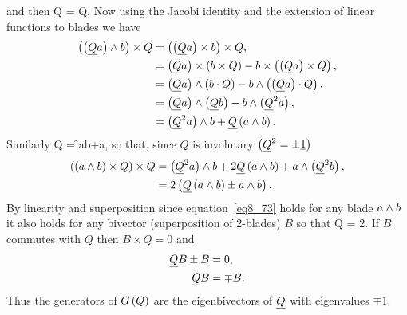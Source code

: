 and then
\be
	\times Q = \times Q.	                                           
\ee
Now using the Jacobi identity and the extension of linear functions to blades we have
\begin{align}
	 \left ( {\left ( {\underline{Q}a} \right )\wedge b} \right )\times Q &= \left ( {\left ( {\underline{Q}a} \right )\times b} \right )\times Q, \nonumber \\
	                                       &= \left ( {\underline{Q}a} \right )\times\left ( {b\times Q} \right )
	                                          -b\times\left ( {\left ( {\underline{Q}a} \right )\times Q} \right ), \nonumber \\
	                                       &= \left ( {\underline{Q}a} \right )\wedge\left ( {b\cdot Q} \right )
	                                          -b\wedge\left ( {\left ( {\underline{Q}a} \right )\cdot Q} \right ), \nonumber \\
	                                       &= \left ( {\underline{Q}a} \right )\wedge\left ( {\underline{Q}b} \right )
	                                          -b\wedge\left ( {\underline{Q}^{2}a} \right ), \nonumber \\
	                                       &= \left ( {\underline{Q}^{2}a} \right )\wedge b+{\underline{Q}}\left ( {a\wedge b} \right ).
\end{align}
Similarly
\be
	\times Q = \f{}{a\W b}+a\W{},
\ee
so that, since $Q$ is involutary $\left ( {\underline{Q}^{2}=\pm\underline{1}} \right )$
\begin{align}
	\left ( {\left ( {a\wedge b} \right )\times Q} \right )\times Q &= \left ( {\underline{Q}^{2}a} \right )\wedge b+2\underline{Q}\left ( {a\wedge b} \right )
	                                         +a\wedge\left ( {\underline{Q}^{2}b} \right ), \nonumber \\
	                                      &= 2\left ( {{\underline{Q}}\left ( {a\wedge b} \right )\pm a\wedge b} \right ).\label{eq8_73}
\end{align}
By linearity and superposition since equation~\ref{eq8_73} holds for any blade $a\wedge b$ it also holds
for any bivector (superposition of 2-blades) $B$ so that
\be
	\times Q = 2.
\ee
If $B$ commutes with $Q$ then $B\times Q = 0$ and
\begin{align}
	\underline{Q}B\pm B &= 0, \\
	\underline{Q}B &= \mp B.
\end{align}
Thus the generators of ${G}\left ( {Q} \right )$ are the eigenbivectors of $\underline{Q}$ with eigenvalues $\mp 1$.

